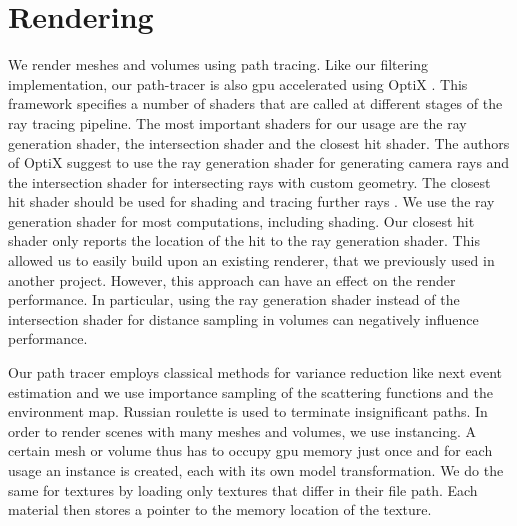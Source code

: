 \section{Rendering}
\label{sec:rendering}
We render meshes and volumes using path tracing.
Like our filtering implementation, our path-tracer is also \ac{gpu} accelerated using OptiX \cite{parker_optix}.
This framework specifies a number of shaders that are called at different stages of the ray tracing pipeline.
The most important shaders for our usage are the ray generation shader, the intersection shader and the closest hit shader.
The authors of OptiX suggest to use the ray generation shader for generating camera rays and the intersection shader for intersecting rays with custom geometry.
The closest hit shader should be used for shading and tracing further rays \cite{parker_optix}.
We use the ray generation shader for most computations, including shading.
Our closest hit shader only reports the location of the hit to the ray generation shader.
This allowed us to easily build upon an existing renderer, that we previously used in another project.
However, this approach can have an effect on the render performance.
In particular, using the ray generation shader instead of the intersection shader for distance sampling in volumes can negatively influence performance.

Our path tracer employs classical methods for variance reduction like next event estimation and we use importance sampling of the scattering functions and the environment map.
Russian roulette is used to terminate insignificant paths.
In order to render scenes with many meshes and volumes, we use instancing.
A certain mesh or volume thus has to occupy \ac{gpu} memory just once and for each usage an instance is created, each with its own model transformation.
We do the same for textures by loading only textures that differ in their file path.
Each material then stores a pointer to the memory location of the texture.

